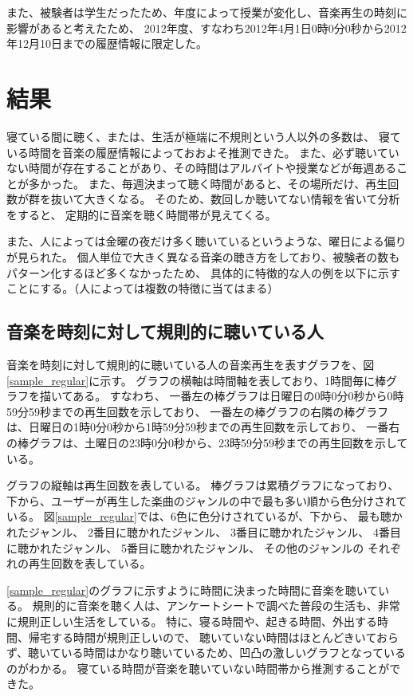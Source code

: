 \documentclass[11pt, onecolumn]{jsarticle}
\begin{document}
また、被験者は学生だったため、年度によって授業が変化し、音楽再生の時刻に影響があると考えたため、
2012年度、すなわち2012年4月1日0時0分0秒から2012年12月10日までの履歴情報に限定した。


\section{結果}
寝ている間に聴く、または、生活が極端に不規則という人以外の多数は、
寝ている時間を音楽の履歴情報によっておおよそ推測できた。
また、必ず聴いていない時間が存在することがあり、その時間はアルバイトや授業などが毎週あることが多かった。
また、毎週決まって聴く時間があると、その場所だけ、再生回数が群を抜いて大きくなる。
そのため、数回しか聴いてない情報を省いて分析をすると、
定期的に音楽を聴く時間帯が見えてくる。

また、人によっては金曜の夜だけ多く聴いているというような、曜日による偏りが見られた。
個人単位で大きく異なる音楽の聴き方をしており、被験者の数もパターン化するほど多くなかったため、
具体的に特徴的な人の例を以下に示すことにする。（人によっては複数の特徴に当てはまる）

\subsection{音楽を時刻に対して規則的に聴いている人}
音楽を時刻に対して規則的に聴いている人の音楽再生を表すグラフを、図\ref{sample_regular}に示す。
グラフの横軸は時間軸を表しており、1時間毎に棒グラフを描いてある。
すなわち、
一番左の棒グラフは日曜日の0時0分0秒から0時59分59秒までの再生回数を示しており、
一番左の棒グラフの右隣の棒グラフは、日曜日の1時0分0秒から1時59分59秒までの再生回数を示しており、
一番右の棒グラフは、土曜日の23時0分0秒から、23時59分59秒までの再生回数を示している。

グラフの縦軸は再生回数を表している。
棒グラフは累積グラフになっており、下から、ユーザーが再生した楽曲のジャンルの中で最も多い順から色分けされている。
図\ref{sample_regular}では、6色に色分けされているが、下から、
最も聴かれたジャンル、
2番目に聴かれたジャンル、
3番目に聴かれたジャンル、
4番目に聴かれたジャンル、
5番目に聴かれたジャンル、
その他のジャンルの
それぞれの再生回数を表している。

\ref{sample_regular}のグラフに示すように時間に決まった時間に音楽を聴いている。
規則的に音楽を聴く人は、アンケートシートで調べた普段の生活も、非常に規則正しい生活をしている。
特に、寝る時間や、起きる時間、外出する時間、帰宅する時間が規則正しいので、
聴いていない時間はほとんどきいておらず、聴いている時間はかなり聴いているため、凹凸の激しいグラフとなっているのがわかる。
寝ている時間が音楽を聴いていない時間帯から推測することができた。
\end{document}
